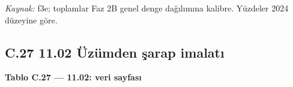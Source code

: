 \endgroup

\emph{Kaynak:} \etiketT{} f3e; toplamlar Faz 2B genel denge dağılımına kalibre. Yüzdeler 2024 düzeyine göre.

\hypertarget{nace_kartlar_10-12-c27-1102-uxfczuxfcmden-ux15farap-imalatux131}{%
\subsection{C.27 11.02 Üzümden şarap imalatı}\label{nace_kartlar_10-12-c27-1102-uxfczuxfcmden-ux15farap-imalatux131}}


\textbf{Tablo C.27 --- 11.02: veri sayfası}

\nopagebreak[4]

\begingroup\gbtablo\small

